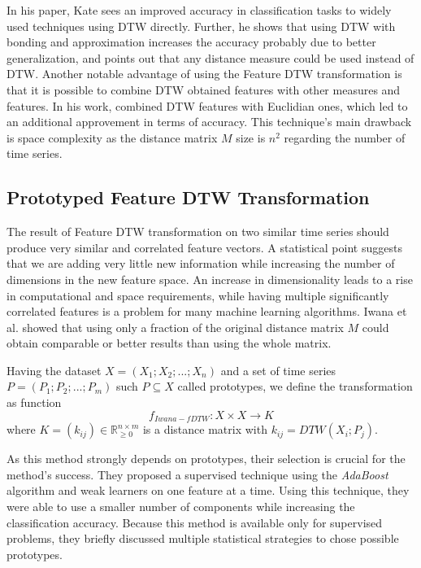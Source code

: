  In his paper, Kate sees an improved accuracy in classification tasks to widely used techniques using DTW directly. Further, he shows that using DTW with bonding and approximation increases the accuracy probably due to better generalization, and points out that any distance measure could be used instead of DTW. Another notable advantage of using the Feature DTW transformation is that it is possible to combine DTW obtained features with other measures and features. In his work, \textcite{met:fDTW} combined DTW features with Euclidian ones, which led to an additional approvement in terms of accuracy. This technique's main drawback is space complexity as the distance matrix $M$ size is $n^2$ regarding the number of time series. 


\subsection{Prototyped Feature DTW Transformation}
The result of Feature DTW transformation on two similar time series should produce very similar and correlated feature vectors. A statistical point suggests that we are adding very little new information while increasing the number of dimensions in the new feature space. An increase in dimensionality leads to a rise in computational and space requirements, while having multiple significantly correlated features is a problem for many machine learning algorithms. Iwana et al. \cite{met:protofDTW} showed that using only a fraction of the original distance matrix $M$ could obtain comparable or better results than using the whole matrix.

Having the dataset $X=(X_1; X_2; ...; X_n)$ and a set of time series $P=(P_1; P_2; ...; P_m)$ such $P \subseteq X$ called prototypes, we define the transformation as function
\begin{equation}
    f_{Iwana-fDTW}: X \times X \rightarrow K
\end{equation}
where $K=(k_{ij}) \in \mathbb{R}_{\ge 0}^{n \times m}$ is a distance matrix with $k_{ij}=DTW(X_i; P_j)$.

As this method strongly depends on prototypes, their selection is crucial for the method's success. They proposed a supervised technique using the \textit{AdaBoost} algorithm and weak learners on one feature at a time. Using this technique, they were able to use a smaller number of components while increasing the classification accuracy. Because this method is available only for supervised problems, they briefly discussed multiple statistical strategies to chose possible prototypes.


